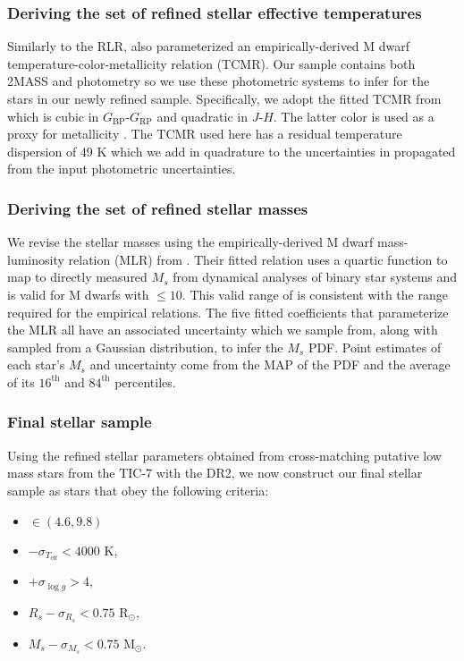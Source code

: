 \subsubsection{Deriving the set of refined stellar effective temperatures}
Similarly to the RLR, \cite{mann15} also parameterized an empirically-derived M dwarf temperature-color-metallicity
relation (TCMR). Our sample contains both 2MASS and \gaia{} photometry so we use these photometric systems to infer
\teff{} for the stars in our newly refined sample. Specifically, we adopt the fitted TCMR from \cite{mann15} which is
cubic in $G_{\text{BP}}$-$G_{\text{RP}}$ and quadratic in $J$-$H$. The latter color is used as a proxy for metallicity
\citep{leggett92,johnson12,mann13,newton14}. The TCMR used here has a residual temperature dispersion of 49 K which we
add in quadrature to the uncertainties in \teff{} propagated from the input photometric uncertainties.

\subsubsection{Deriving the set of refined stellar masses}
We revise the stellar masses using the empirically-derived M dwarf mass-luminosity relation (MLR) from  
\cite{benedict16}. Their fitted relation uses a quartic function to map \MK{} to directly measured $M_s$ from
dynamical analyses of binary star systems and is valid for M dwarfs with \MK{} $\leq 10$. This valid range of 
\MK{} is consistent with the range required for the \cite{mann15} empirical relations. The five fitted
coefficients that parameterize the MLR all have an associated uncertainty which we sample from, along with \MK{}
sampled from a Gaussian distribution, to infer the $M_s$ PDF. Point estimates of each star's $M_s$ and uncertainty
come from the MAP of the PDF and the average of its $16^{\text{th}}$ and $84^{\text{th}}$ percentiles. 

\subsubsection{Final stellar sample}
Using the refined stellar parameters obtained from cross-matching putative low mass stars from the TIC-7 with
the \gaia{} DR2, we now construct our final stellar sample as stars that obey the following criteria:

\begin{itemize}
\item \MK{} $\in (4.6,9.8)$
\item \teff{} $- \sigma_{T_{\text{eff}}} < 4000$ K,
\item \logg{} $+ \sigma_{\log{g}}>4$,
\item $R_s -\sigma_{R_s} < 0.75$ R$_{\odot}$,
\item $M_s - \sigma_{M_s} < 0.75$ M$_{\odot}$.
\end{itemize}

